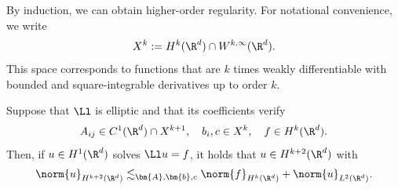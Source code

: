 \documentclass[
    a4paper,
    DIV=14,
    abstract=true,
    numbers=noenddot
]{scrartcl}
\begin{document}
By induction, we can obtain higher-order regularity. For notational convenience, we write
\begin{align*}
    X^k:= H^k(\R^d) \cap W^{k,\infty}(\R^d).
\end{align*}
This space corresponds to functions that are $k$ times weakly differentiable with bounded and square-integrable derivatives up to order $k$.
\begin{theorem}[Regularity on $\R^d$ ]\label{higher regularity Rd}
    Suppose that $\Ll $ is elliptic and that its coefficients verify
    \begin{align*}
        A_{ij} \in C^{1}(\R^d)\cap X^{k+1}, \quad b_i,c \in X^k, \quad f \in H^k(\R^d).
    \end{align*}
    Then, if $u \in H^1(\R^d)$ solves $\Ll u=f$, it holds that $u \in H^{k+2}(\R^d)$ with
    \begin{align*}
        \norm{u}_{H  ^{k+2}(\R^d)} \lesssim_{\bm{A},\bm{b},c} \norm{f}_{H^k(\R^d)}+\norm{u}_{L^2(\R^d)}.
    \end{align*}
\end{theorem}
\end{document}
